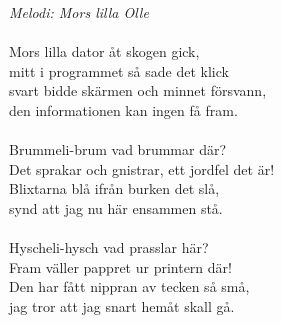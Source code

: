 {\footnotesize\textit{Melodi: Mors lilla Olle}}\\
\\
Mors lilla dator åt skogen gick,\\
mitt i programmet så sade det klick\\
svart bidde skärmen och minnet försvann,\\
den informationen kan ingen få fram.\\
\\
Brummeli-brum vad brummar där?\\
Det sprakar och gnistrar, ett jordfel det är!\\
Blixtarna blå ifrån burken det slå,\\
synd att jag nu här ensammen stå.\\
\\
Hyscheli-hysch vad prasslar här?\\
Fram väller pappret ur printern där!\\
Den har fått nippran av tecken så små,\\
jag tror att jag snart hemåt skall gå.
